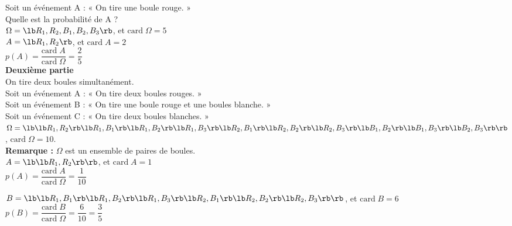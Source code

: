 Soit un événement A : « On tire une boule rouge. » \\

Quelle est la probabilité de A ? \\

$ \Omega = \lb R_1, R_2, B_1, B_2, B_3 \rb $, et $\mathrm{card} \; \Omega = 5 $ \\

$ A = \lb R_1, R_2 \rb $, et $ \mathrm{card} \; A = 2 $ \\

$ p\left(A\right) = \dfrac{\mathrm{card} \; A}{\mathrm{card} \; \Omega} = \dfrac{2}{5} $ \\

\textbf{Deuxième partie} \\

On tire deux boules simultanément. \\ Soit un événement A : « On tire deux boules rouges. » \\Soit un événement B : « On tire une boule rouge et une boules blanche. » \\Soit un événement C : « On tire deux boules blanches. » \\

$\Omega = \lb \lb R_1,R_2 \rb \lb R_1,B_1 \rb \lb R_1,B_2 \rb \lb R_1,B_3 \rb \lb R_2,B_1 \rb \lb R_2,B_2 \rb \lb R_2,B_3 \rb \lb B_1,B_2 \rb \lb B_1,B_3 \rb \lb B_2,B_3 \rb \rb  $, $\mathrm{card} \; \Omega = 10 $. \\

\textbf{Remarque :} $\Omega$ est un ensemble de paires de boules. \\

$A = \lb \lb R_1, R_2 \rb \rb $, et $\mathrm{card} \; A = 1 $ \\

$ p\left(A\right) = \dfrac{\mathrm{card} \; A}{\mathrm{card} \; \Omega} = \dfrac{1}{10}$ \\

\vspace*{.3cm}

$B = \lb \lb R_1, B_1 \rb \lb R_1, B_2 \rb\lb R_1, B_3 \rb\lb R_2, B_1 \rb \lb R_2, B_2 \rb \lb R_2, B_3 \rb \rb $, et $\mathrm{card} \; B = 6 $ \\

$ p\left(B\right) = \dfrac{\mathrm{card} \; B}{\mathrm{card} \; \Omega} = \dfrac{6}{10} = \dfrac{3}{5}$ \\

\vspace*{.3cm}

